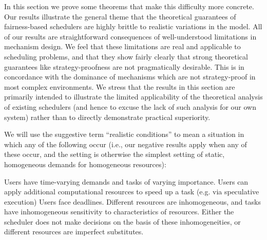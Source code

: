 \documentclass{acm_proc_article-sp}
\begin{document}
In this section we prove some theorems that make this difficulty more concrete. Our results illustrate the general theme that the theoretical guarantees of fairness-based schedulers are highly brittle to realistic variations in the model. All of our results are straightforward consequences of well-understood limitations in mechanism design. We feel that these limitations are real and applicable to scheduling problems, and that they show fairly clearly that strong theoretical guarantees like strategy-proofness are not pragmatically desirable. This is in concordance with the dominance of mechanisms which are not strategy-proof in most complex environments. We stress that the results in this section are primarily intended to illustrate the limited applicability of the theoretical analysis of existing schedulers (and hence to excuse the lack of such analysis for our own system) rather than to directly demonstrate practical superiority.

We will use the suggestive term ``realistic conditions'' to mean a situation in which any of the following occur (i.e., our negative results apply when any of these occur, and the setting is otherwise the simplest setting of static, homogeneous demands for homogeneous resources):

Users have time-varying demands and tasks of varying importance.
Users can apply additional computational resources to speed up a task (e.g. via speculative execution)
Users face deadlines.
Different resources are inhomogeneous, and tasks have inhomogeneous sensitivity to characteristics of resources. Either the scheduler does not make decisions on the basis of these inhomogeneities, or different resources are imperfect substitutes.
\end{document}
